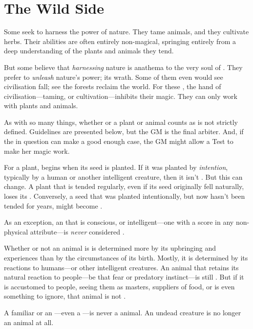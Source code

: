 
\section{The Wild Side}

Some  seek to harness the power of nature.
They tame animals, and they cultivate herbs.
Their abilities are often entirely non-magical, springing entirely from a deep understanding of the plants and animals they tend.

But some believe that \emph{harnessing} nature is anathema to the very soul of .
They prefer to \emph{unleash} nature's power; its wrath.
Some of them even would see civilisation fall; see the forests reclaim the world.
For these , the hand of civilisation---taming, or cultivation---inhibits their magic.
They can only work with {\wild} plants and animals.

As with so many things, whether or a plant or animal counts as {\wild} is not strictly defined.
Guidelines are presented below, but the GM is the final arbiter.
And, if the  in question can make a good enough case, the GM might allow a Test to make her magic work.

For a plant, {\wildness} begins when its seed is planted.
If it was planted by \emph{intention}, typically by a human or another intelligent creature, then it isn't {\wild}.
But this can change.
A plant that is tended regularly, even if its seed originally fell naturally, loses its {\wildness}.
Conversely, a seed that was planted intentionally, but now hasn't been tended for years, might become {\wild}.

As an exception, an  that is conscious, or intelligent---one with a score in any non-physical attribute---is \emph{never} considered {\wild}.

Whether or not an animal is {\wild} is determined more by its upbringing and experiences than by the circumstances of its birth.
Mostly, it is determined by its reactions to humans---or other intelligent creatures.
An animal that retains its natural reaction to people---be that fear or predatory instinct---is still {\wild}.
But if it is accustomed to people, seeing them as masters, suppliers of food, or is even something to ignore, that animal is not {\wild}.

A familiar or an ---even a ---is never a {\wild} animal.
An undead creature is no longer an animal at all.


